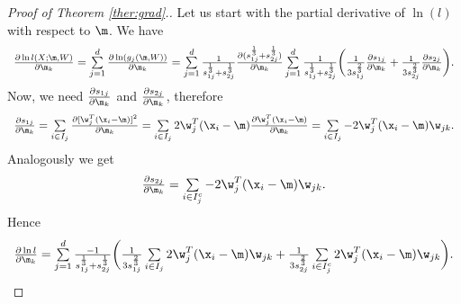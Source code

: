 \begin{proof}[Proof of Theorem \ref{ther:grad}.]
Let us start with the partial derivative of $\ln({l})$ with respect to $\m$. We have
$$
\begin{array}{l}
\frac{\partial \ln {l}(X;\m,W)}{\partial \m_k} =
\sum \limits_{j=1}^d \frac{\partial \ln ({g}_j(\m,W))}{\partial \m_k} = \sum\limits_{j=1}^d \frac{1}{{s}_{1j}^{\frac{1}{3}} + {s}_{2j}^{\frac{1}{3}}} \frac{\partial ({s}_{1j}^{\frac{1}{3}} + {s}_{2j}^{\frac{1}{3}})}{\partial \m_k} %
 \sum \limits_{j=1}^d \frac{1}{{s}_{1j}^{\frac{1}{3}} + {s}_{2j}^{\frac{1}{3}}} \bigg(
\frac{1}{3 {s}_{1j}^{\frac{2}{3}}} \frac{\partial {s}_{1j}}{\partial \m_k} +
\frac{1}{3 {s}_{2j}^{\frac{2}{3}}} \frac{\partial {s}_{2j}}{\partial \m_k}
\bigg).
\end{array}
$$
Now, we need $\frac{\partial {s}_{1j}}{\partial \m_k}$ and $\frac{\partial {s}_{2j}}{\partial \m_k}$, therefore
$$
\begin{array}{l}
\frac{\partial {s}_{1j}}{\partial \m_k} = 
\sum\limits_{i \in {I}_j} \frac{\partial [\w^T_j (\x_i - \m)]^2}{\partial \m_k} = \sum\limits_{i \in {I}_j} 2 \w^T_j (\x_i - \m) \frac{\partial \w^T_j (\x_i - \m)}{\partial \m_k} = %
 \sum\limits_{i \in {I}_j} - 2 \w^T_j (\x_i - \m) \w_{jk}.
\end{array}
$$
Analogously we get
$$
\begin{array}{l}
\frac{\partial {s}_{2j}}{\partial \m_k} = \sum\limits_{i \in {I}_j^c} -2 \w^T_j (\x_i - \m) \w_{jk}.
\end{array}
$$
Hence 
$$
\begin{array}{l}
\frac{\partial \ln {l}}{\partial \m_k} =\sum\limits_{j=1}^d \frac{-1}{{s}_{1j}^{\frac{1}{3}} + {s}_{2j}^{\frac{1}{3}}} \bigg(
\frac{1}{3 {s}_{1j}^{\frac{2}{3}}} \sum\limits_{i \in I_j} 2 \w_j^T (\x_i - \m)  \w_{jk} +%
\frac{1}{3 {s}_{2j}^{\frac{2}{3}}} \sum\limits_{i \in I_j^c} 2 \w_j^T (\x_i - \m) \w_{jk}
\bigg).
\end{array}
$$


\end{proof}
